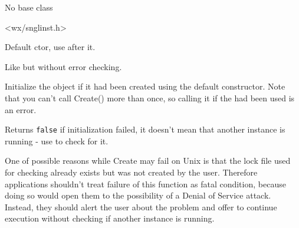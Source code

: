 No base class


<wx/snglinst.h>


\label{wxsingleinstancecheckerctor}


Default ctor, use  after it.

\label{wxsingleinstancecheckerwxsingleinstancechecker}


Like  but without
error checking.

\label{wxsingleinstancecheckercreate}


Initialize the object if it had been created using the default constructor.
Note that you can't call Create() more than once, so calling it if the 
had been used is an error.





Returns {\tt false} if initialization failed, it doesn't mean that another
instance is running - use 
 to check
for it.


One of possible reasons while Create may fail on Unix is that the lock file
used for checking already exists but was not created by the user.
Therefore applications shouldn't treat failure of this function as fatal
condition, because doing so would open them to the possibility of a Denial of
Service attack. Instead, they should alert the user about the problem and
offer to continue execution without checking if another instance is running.

